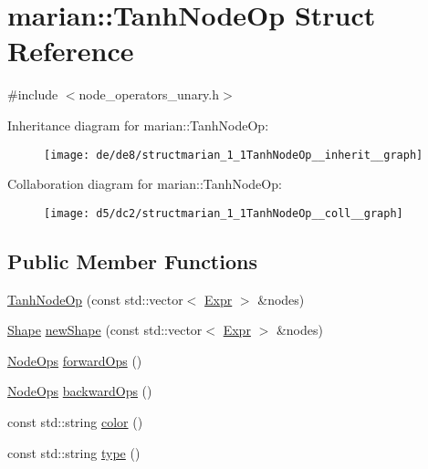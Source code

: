 \hypertarget{structmarian_1_1TanhNodeOp}{}\section{marian\+:\+:Tanh\+Node\+Op Struct Reference}
\label{structmarian_1_1TanhNodeOp}


{\ttfamily \#include $<$node\+\_\+operators\+\_\+unary.\+h$>$}



Inheritance diagram for marian\+:\+:Tanh\+Node\+Op\+:
\nopagebreak
\begin{figure}[H]
\begin{center}
\leavevmode
\texttt{[image: de/de8/structmarian\_1\_1TanhNodeOp\_\_inherit\_\_graph]}
\end{center}
\end{figure}


Collaboration diagram for marian\+:\+:Tanh\+Node\+Op\+:
\nopagebreak
\begin{figure}[H]
\begin{center}
\leavevmode
\texttt{[image: d5/dc2/structmarian\_1\_1TanhNodeOp\_\_coll\_\_graph]}
\end{center}
\end{figure}
\subsection*{Public Member Functions}
\begin{DoxyCompactItemize}
\item 
\hyperlink{structmarian_1_1TanhNodeOp_a5aea6b7aa9d3412374bfa5c423f32068}{Tanh\+Node\+Op} (const std\+::vector$<$ \hyperlink{namespacemarian_a498d8baf75b754011078b890b39c8e12}{Expr} $>$ \&nodes)
\item 
\hyperlink{structmarian_1_1Shape}{Shape} \hyperlink{structmarian_1_1TanhNodeOp_a09f244867abe44271e2138204eaff0d2}{new\+Shape} (const std\+::vector$<$ \hyperlink{namespacemarian_a498d8baf75b754011078b890b39c8e12}{Expr} $>$ \&nodes)
\item 
\hyperlink{namespacemarian_a4956376218cc236016c20bc4071470da}{Node\+Ops} \hyperlink{structmarian_1_1TanhNodeOp_a96a8cfc7646b2b73b421a099cabdb579}{forward\+Ops} ()
\item 
\hyperlink{namespacemarian_a4956376218cc236016c20bc4071470da}{Node\+Ops} \hyperlink{structmarian_1_1TanhNodeOp_a01f8dfc69d49509d2ba630517d3e10d6}{backward\+Ops} ()
\item 
const std\+::string \hyperlink{structmarian_1_1TanhNodeOp_acb68c7e8dbabe5285de4b0666044302a}{color} ()
\item 
const std\+::string \hyperlink{structmarian_1_1TanhNodeOp_a451895f7e17e7fe2ac3c20250a998758}{type} ()
\end{DoxyCompactItemize}
